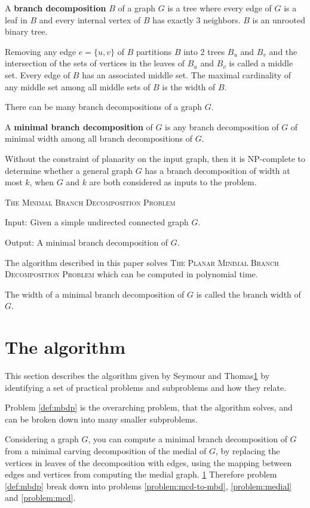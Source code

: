 \documentclass{article}
\begin{document}
	A \textbf{branch decomposition} $B$ of a graph $G$ is a tree where every edge of $G$ is a leaf in $B$ and every internal vertex of $B$ has exactly 3 neighbors. $B$ is an unrooted binary tree.

	Removing any edge $e = \{u,v\}$ of $B$ partitions $B$ into 2 trees $B_u$ and $B_v$ and the intersection of the sets of vertices in the leaves of $B_u$ and $B_v$ is called a middle set. Every edge of $B$ has an associated middle set. The maximal cardinality of any middle set among all middle sets of $B$ is the width of $B$.

	There can be many branch decompositions of a graph $G$.

	A \textbf{minimal branch decomposition} of $G$ is any branch decomposition of $G$ of minimal width among all branch decompositions of $G$.

	Without the constraint of planarity on the input graph, then it is NP-complete to determine whether a general graph $G$ has a branch decomposition of width at most $k$, when $G$ and $k$ are both considered as inputs to the problem.

	\begin{definition}\label{def:mbdp}
		\textsc{The Minimal Branch Decomposition Problem}

		Input: Given a simple undirected connected graph $G$.

		Output: A minimal branch decomposition of $G$.
	\end{definition}

	The algorithm described in this paper solves \textsc{The Planar Minimal Branch Decomposition Problem} which can be computed in polynomial time.

	The width of a minimal branch decomposition of $G$ is called the branch width of $G$.

\section{The algorithm}
	This section describes the algorithm given by Seymour and Thomas\ref{} by identifying a set of practical problems and subproblems and how they relate.
	
	Problem \ref{def:mbdp} is the overarching problem, that the algorithm solves, and can be broken down into many smaller subproblems.

	Considering a graph $G$, you can compute a minimal branch decomposition of $G$ from a minimal carving decomposition of the medial of $G$, by replacing the vertices in leaves of the decomposition with edges, using the mapping between edges and vertices from computing the medial graph. \ref{} Therefore problem \ref{def:mbdp} break down into problems \ref{problem:mcd-to-mbd}, \ref{problem:medial} and \ref{problem:mcd}.
\end{document}
